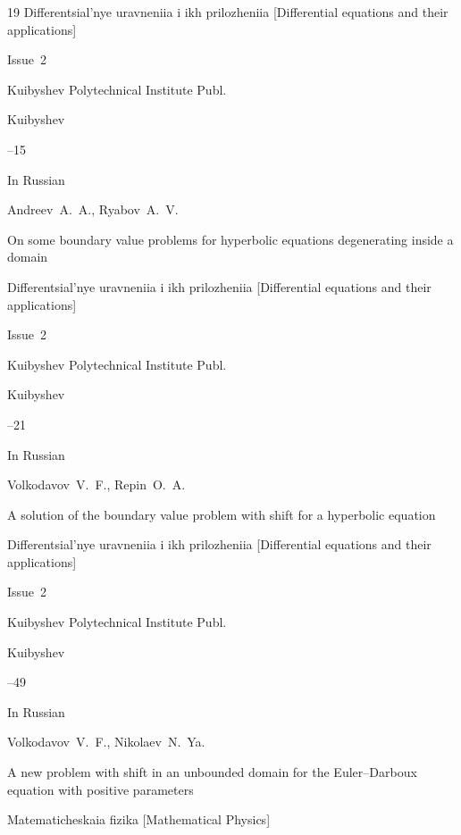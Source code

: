 \begin{thebibliography}{19}
\inbook Differentsial'nye uravneniia i ikh prilozheniia \rm [Differential equations and their applications]

\issueinfo Issue~2

\publ Kuibyshev  Polytechnical Institute Publ.

\publaddr Kuibyshev 


--15






\lang In Russian

\by Andreev~A.~A., Ryabov~A.~V.

\paper On some boundary value problems for hyperbolic equations degenerating inside a domain

\inbook Differentsial'nye uravneniia i ikh prilozheniia \rm [Differential equations and their applications]

\issueinfo Issue~2

\publ Kuibyshev  Polytechnical Institute Publ.

\publaddr Kuibyshev 


--21




\lang In Russian

\by Volkodavov~V.~F., Repin~O.~A.

\paper A solution of the boundary value problem with shift for a hyperbolic equation

\inbook Differentsial'nye uravneniia i ikh prilozheniia \rm [Differential equations and their applications]

\issueinfo Issue~2

\publ Kuibyshev  Polytechnical Institute Publ.

\publaddr Kuibyshev 


--49




\lang In Russian

\by Volkodavov~V.~F., Nikolaev~N.~Ya.

\paper A new problem with shift in an unbounded domain for the Euler--Darboux equation with positive parameters

\inbook Matematicheskaia fizika \rm [Mathematical Physics]


\end{thebibliography}
